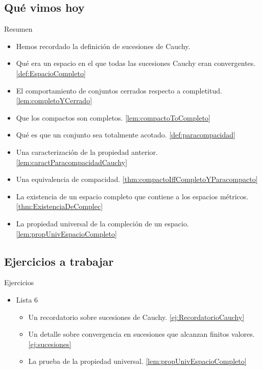 \documentclass[utf8]{beamer}
\theoremstyle{plain}
\theoremstyle{definition}
\theoremstyle{remark}
\numberwithin{equation}{section}
\begin{document}
\subsection*{Qu\'e vimos hoy}
\begin{frame}{Resumen}

  \begin{itemize}
  \item Hemos recordado la definición de sucesiones de Cauchy.
  \item Qué era un espacio en el que todas las sucesiones Cauchy eran convergentes. \ref{def:EspacioCompleto}
  \item El comportamiento de conjuntos cerrados respecto a completitud. \ref{lem:completoYCerrado}
  \item Que los compactos son completos. \ref{lem:compactoToCompleto}
  \item Qué es que un conjunto sea totalmente acotado. \ref{def:paracompacidad}
  \item Una caracterización de la propiedad anterior. \ref{lem:caractParacompacidadCauchy}
  \item Una equivalencia de compacidad. \ref{thm:compactoIffCompletoYParacompacto}
  \item La existencia de un espacio completo que contiene a los espacios métricos. \ref{thm:ExistenciaDeComplec}
  \item La propiedad universal de la compleción de un espacio. \ref{lem:propUnivEspacioCompleto}
  \end{itemize}
  
\end{frame}

\subsection*{Ejercicios a trabajar}
\begin{frame}{Ejercicios}
    
  \begin{itemize}
    \item
      Lista 6
      \begin{itemize}
      \item Un recordatorio sobre sucesiones de Cauchy. \ref{ej:RecordatorioCauchy}
      \item Un detalle sobre convergencia en sucesiones que alcanzan finitos valores. \ref{ej:sucesiones}
      \item La prueba de la propiedad universal. \ref{lem:propUnivEspacioCompleto}
      \end{itemize}
    \end{itemize}
  
\end{frame}
\end{document}

